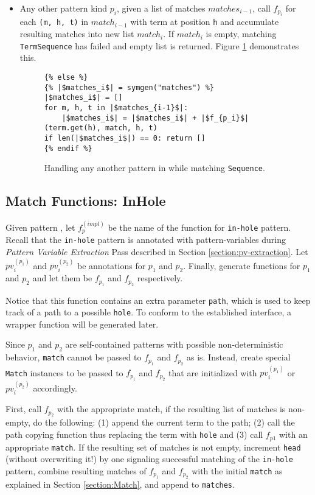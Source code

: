 \begin{itemize}
\item Any other pattern kind $p_i$, given a list of matches $matches_{i-1}$, call $f_{p_i}$ for each \texttt{(m, h, t)} in $match_{i-1}$ with term at position \texttt{h} and accumulate resulting matches into new list $match_{i}$. If $match_{i}$ is empty, matching \texttt{TermSequence} has failed and empty list is returned. Figure \ref{codegen-pattern-seq-3} demonstrates this.

\begin{figure}[htb]
\begin{verbatim}
{% else %}
{% |$matches_i$| = symgen("matches") %}
|$matches_i$| = []
for m, h, t in |$matches_{i-1}$|:
	|$matches_i$| = |$matches_i$| + |$f_{p_i}$|(term.get(h), match, h, t)
if len(|$matches_i$|) == 0: return []
{% endif %}
\end{verbatim}
\caption{Handling any another pattern in \PatternSequenceNoArg \space while matching \texttt{Sequence}.}
\label{codegen-pattern-seq-3}
\end{figure}
\end{itemize}

\subsection{Match Functions: InHole}
Given pattern \PatternInHole, let $f_p^{(impl)}$ be the name of the function for \texttt{in-hole} pattern. Recall that the \texttt{in-hole} pattern is annotated with pattern-variables during \textit{Pattern Variable Extraction} Pass described in Section \ref{section:pv-extraction}. Let $pv_i^{(p_1)}$ and $pv_i^{(p_2)}$ be annotations for $p_1$ and $p_2$. Finally, generate functions for $p_1$ and $p_2$ and let them be $f_{p_1}$ and $f_{p_2}$ respectively.

Notice that this function contains an extra parameter \texttt{path}, which is used to keep track of a path to a possible \texttt{hole}. To conform to the established interface, a wrapper function will be generated later.

Since $p_1$ and $p_2$ are self-contained patterns with possible non-deterministic behavior, \texttt{match} cannot be passed to $f_{p_1}$ and $f_{p_2}$ as is. Instead, create special \texttt{Match} instances to be passed to $f_{p_1}$ and $f_{p_2}$ that are initialized with $pv_i^{(p_1)}$ or $pv_i^{(p_2)}$ accordingly.

First, call $f_{p_2}$ with the appropriate match, if the resulting list of matches is non-empty, do the following: (1) append the current term to the path; (2) call the path copying function thus replacing the term with \texttt{hole} and (3) call $f_{p1}$ with an appropriate \texttt{match}. If the resulting set of matches is not empty, increment \texttt{head} (without overwriting it!) by one signaling successful matching of the \texttt{in-hole} pattern, combine resulting matches of $f_{p_1}$ and $f_{p_2}$ with the initial \texttt{match} as explained in Section \ref{section:Match}, and append to \texttt{matches}.

